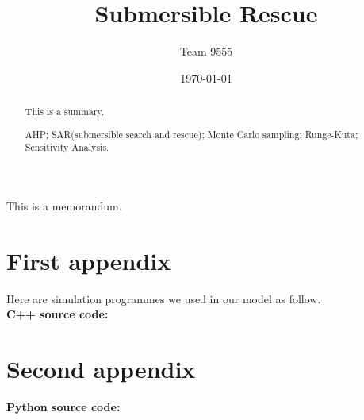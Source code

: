 \documentclass{mcmthsis}  %
\title{Submersible Rescue}  %
\author{\small Team 9555}  %
\date{\today}  %
\begin{document}
\begin{abstract}  %
This is a summary.
\begin{keywords}  %
AHP; SAR(submersible search and rescue); Monte Carlo sampling; Runge-Kuta; Sensitivity Analysis.
\end{keywords}  %
\end{abstract}  %
\maketitle  %
\tableofcontents  %



\newpage  %









\newpage
\printbibliography  %


\newpage
\begin{appendices}  %

\begin{memo}[Memorandum]  %
	This is a memorandum.
\end{memo}  %

\section{First appendix}  %

Here are simulation programmes we used in our model as follow.\\
\textbf{C++ source code:}


\section{Second appendix}  %

\textbf{Python source code:}


\end{appendices}  %
\end{document}
